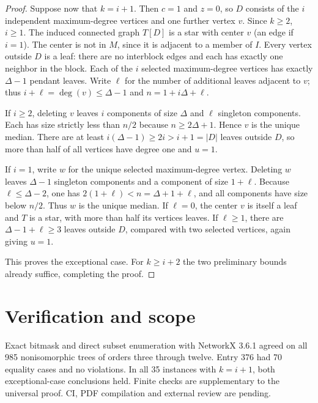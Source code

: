 \documentclass[11pt]{article}
\begin{document}
\begin{proof}
Suppose now that $k=i+1$. Then $c=1$ and $z=0$, so $D$ consists of the $i$ independent maximum-degree vertices and one further vertex $v$. Since $k\ge2$, $i\ge1$. The induced connected graph $T[D]$ is a star with center $v$ (an edge if $i=1$). The center is not in $M$, since it is adjacent to a member of $I$. Every vertex outside $D$ is a leaf: there are no interblock edges and each has exactly one neighbor in the block. Each of the $i$ selected maximum-degree vertices has exactly $\Delta-1$ pendant leaves. Write $\ell$ for the number of additional leaves adjacent to $v$; thus $i+\ell=\deg(v)\le\Delta-1$ and $n=1+i\Delta+\ell$.

If $i\ge2$, deleting $v$ leaves $i$ components of size $\Delta$ and $\ell$ singleton components. Each has size strictly less than $n/2$ because $n\ge2\Delta+1$. Hence $v$ is the unique median. There are at least $i(\Delta-1)\ge2i>i+1=|D|$ leaves outside $D$, so more than half of all vertices have degree one and $u=1$.

If $i=1$, write $w$ for the unique selected maximum-degree vertex. Deleting $w$ leaves $\Delta-1$ singleton components and a component of size $1+\ell$. Because $\ell\le\Delta-2$, one has $2(1+\ell)<n=\Delta+1+\ell$, and all components have size below $n/2$. Thus $w$ is the unique median. If $\ell=0$, the center $v$ is itself a leaf and $T$ is a star, with more than half its vertices leaves. If $\ell\ge1$, there are $\Delta-1+\ell\ge3$ leaves outside $D$, compared with two selected vertices, again giving $u=1$.

This proves the exceptional case. For $k\ge i+2$ the two preliminary bounds already suffice, completing the proof.
\end{proof}

\section{Verification and scope}
Exact bitmask and direct subset enumeration with NetworkX 3.6.1 agreed on all 985 nonisomorphic trees of orders three through twelve. Entry 376 had 70 equality cases and no violations. In all 35 instances with $k=i+1$, both exceptional-case conclusions held. Finite checks are supplementary to the universal proof. CI, PDF compilation and external review are pending.
\end{document}

